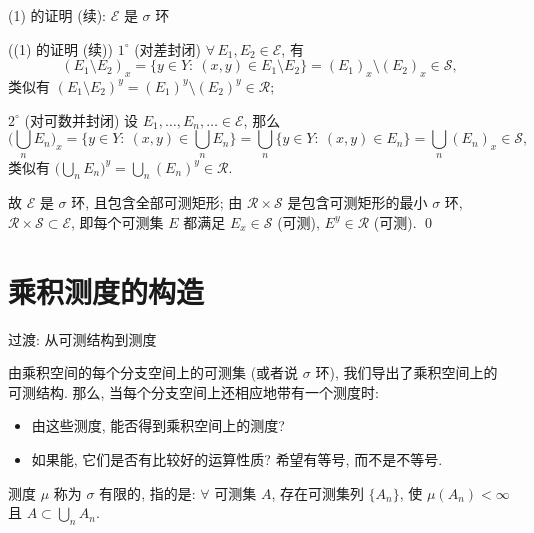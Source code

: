 \begin{frame}{(1) 的证明 (续): $\mathcal{E}$ 是 $\sigma$ 环}

\startproof[bg=yellow, fg=red]((1) 的证明 (续))
$1^{\circ}$ (对差封闭) $\forall\, E_1, E_2 \in \mathcal{E}$, 有
\[
(E_1 \setminus E_2)_x
= \{ y \in Y:\ (x, y) \in E_1 \setminus E_2 \}
= (E_1)_x \setminus (E_2)_x
\in \mathscr{S} ,
\]
类似有 $(E_1 \setminus E_2)^y = (E_1)^y \setminus (E_2)^y \in \mathscr{R}$;

\pause

$2^{\circ}$ (对可数并封闭) 设 $E_1, \dots, E_n, \dots \in \mathcal{E}$, 那么
\[
\Big( \bigcup_n E_n \Big)_x
= \{ y \in Y:\ (x, y) \in \bigcup_n E_n \}
= \bigcup_n \{ y \in Y:\ (x, y) \in E_n \}
= \bigcup_n (E_n)_x
\in \mathscr{S} ,
\]
类似有 $\big( \bigcup_n E_n \big)^y = \bigcup_n (E_n)^y \in \mathscr{R}$.

\pause

故 $\mathcal{E}$ 是 $\sigma$ 环, 且包含全部可测矩形; 由
$\mathscr{R} \times \mathscr{S}$ 是包含可测矩形的\alert{最小} $\sigma$ 环,
$\mathscr{R} \times \mathscr{S} \subset \mathcal{E}$,
即每个可测集 $E$ 都满足 $E_x \in \mathscr{S}$ (可测), $E^y \in \mathscr{R}$ (可测). \qed

\end{frame}


\section[乘积测度]{乘积测度的构造}


\begin{frame}{过渡: 从可测结构到测度}

\begin{attnblock}[问题]
由乘积空间的每个分支空间上的可测集 (或者说 $\sigma$ 环), 我们导出了乘积空间上的
可测结构. 那么, 当每个分支空间上还相应地带有一个\alert{测度}时:
\begin{itemize}
\item 由这些测度, 能否得到乘积空间上的测度?
\item 如果能, 它们是否有比较好的运算性质? \alert{希望有等号, 而不是不等号}.
\end{itemize}
\end{attnblock}

\pause

\begin{Def}[$\sigma$ 有限]
测度 $\mu$ 称为 \alert{$\sigma$ 有限的}, 指的是: $\forall$ 可测集 $A$, 存在可测集列
$\{A_n\}$, 使 $\mu(A_n) < \infty$ 且 $A \subset \bigcup_n A_n$.
\end{Def}

\end{frame}


